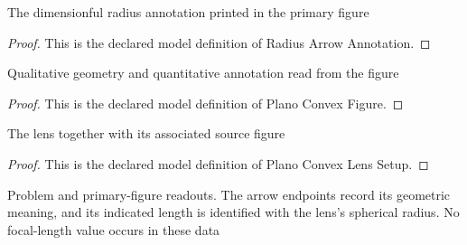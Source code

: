 \begin{definition}
  \label{def:physics:phyx-mini-0065:phyxminiproblems-problemphyxmini0065-radiusarrowannotation}
  The dimensionful radius annotation printed in the primary figure
\end{definition}
\begin{proof}
  This is the declared model definition of Radius Arrow Annotation.
\end{proof}
\begin{definition}
  \label{def:physics:phyx-mini-0065:phyxminiproblems-problemphyxmini0065-planoconvexfigure}
  Qualitative geometry and quantitative annotation read from the figure
\end{definition}
\begin{proof}
  This is the declared model definition of Plano Convex Figure.
\end{proof}
\begin{definition}
  \label{def:physics:phyx-mini-0065:phyxminiproblems-problemphyxmini0065-planoconvexlenssetup}
  The lens together with its associated source figure
\end{definition}
\begin{proof}
  This is the declared model definition of Plano Convex Lens Setup.
\end{proof}
\begin{definition}
  \label{def:physics:phyx-mini-0065:phyxminiproblems-problemphyxmini0065-matchesproblemandfigure}
  Problem and primary-figure readouts. The arrow endpoints record its geometric meaning, and its indicated length is identified with the lens's spherical radius. No focal-length value occurs in these data
\end{definition}

